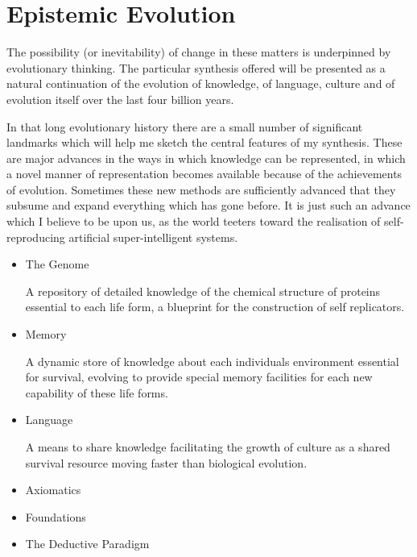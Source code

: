 \documentclass[10pt,titlepage]{book}
\begin{document}
\section{Epistemic Evolution}

The possibility (or inevitability) of change in these matters is underpinned by evolutionary thinking.
The particular synthesis offered will be presented as a natural continuation of the evolution of knowledge, of language, culture and of evolution itself over the last four billion years.

In that long evolutionary history there are a small number of significant landmarks which will help me sketch the central features of my synthesis.
These are major advances in the ways in which knowledge can be represented, in which a novel manner of representation becomes available  because of the achievements of evolution.
Sometimes these new methods are sufficiently advanced that they subsume and expand everything which has gone before.
It is just such an advance which I believe to be upon us, as the world teeters toward the realisation of self-reproducing artificial super-intelligent systems.

\begin{itemize}
\item{The Genome}
  
  A repository of detailed knowledge of the chemical structure of proteins essential to each life form, a blueprint for the construction of self replicators.
\item{Memory}
  
  A dynamic store of knowledge about each individuals environment essential for survival, evolving to provide special memory facilities for each new capability of these life forms.
\item{Language}
  
  A means to share knowledge facilitating the growth of culture as a shared survival resource moving faster than biological evolution.
  
\item{Axiomatics}
  
\item{Foundations}

\item{The Deductive Paradigm}
  
\end{itemize}
\end{document}
